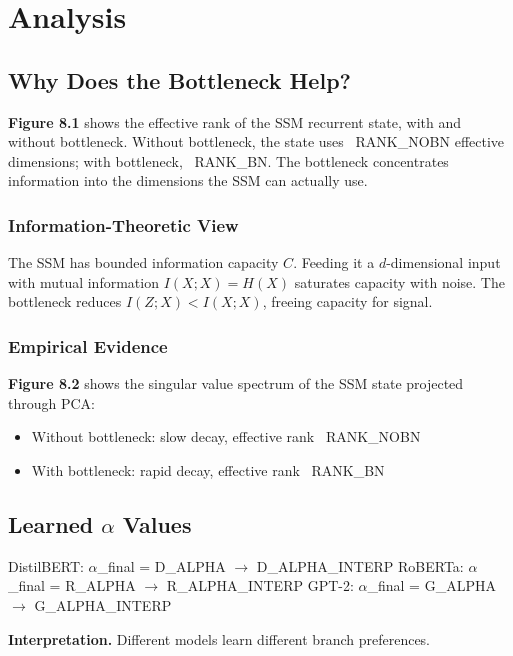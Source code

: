\section{Analysis}

\subsection{Why Does the Bottleneck Help?}

\textbf{Figure 8.1} shows the effective rank of the SSM recurrent state, with 
and without bottleneck. Without bottleneck, the state uses ~{{RANK\_NOBN}} 
effective dimensions; with bottleneck, ~{{RANK\_BN}}. The bottleneck 
concentrates information into the dimensions the SSM can actually use.

\subsubsection{Information-Theoretic View}

The SSM has bounded information capacity $C$. Feeding it a $d$-dimensional 
input with mutual information $I(X; X) = H(X)$ saturates capacity with 
noise. The bottleneck reduces $I(Z; X) < I(X; X)$, freeing capacity for 
signal.

\subsubsection{Empirical Evidence}

\textbf{Figure 8.2} shows the singular value spectrum of the SSM state 
projected through PCA:
\begin{itemize}
\item Without bottleneck: slow decay, effective rank ~{{RANK\_NOBN}}
\item With bottleneck: rapid decay, effective rank ~{{RANK\_BN}}

\end{itemize}
\subsection{Learned $\alpha$ Values}

DistilBERT: $\alpha$\_final = {{D\_ALPHA}} $\to$ {{D\_ALPHA\_INTERP}}
RoBERTa: $\alpha$\_final = {{R\_ALPHA}} $\to$ {{R\_ALPHA\_INTERP}}
GPT-2: $\alpha$\_final = {{G\_ALPHA}} $\to$ {{G\_ALPHA\_INTERP}}

\textbf{Interpretation.} Different models learn different branch preferences.

